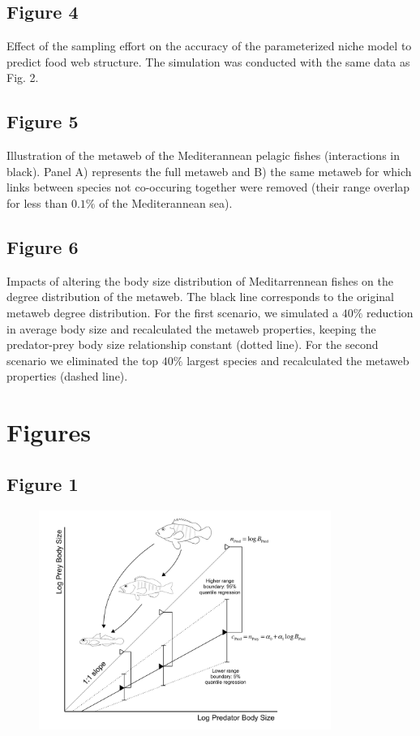 \documentclass[12pt]{article}
\begin{document}
\subsection*{Figure 4} 
Effect of the sampling effort on the accuracy of the
parameterized niche model to predict food web structure. The simulation was
conducted with the same data as Fig. 2.

\subsection*{Figure 5} 
Illustration of the metaweb of the Mediterannean pelagic
fishes (interactions in black). Panel A) represents the full metaweb and B) the
same metaweb for which links between species not co-occuring together were
removed (their range overlap for less than $0.1\%$ of the Mediterannean sea).

\subsection*{Figure 6} 
Impacts of altering the body size distribution of
Meditarrennean fishes on the degree distribution of the metaweb. The black line
corresponds to the original metaweb degree distribution. For the first scenario,
we simulated a $40\%$ reduction in average body size and recalculated the
metaweb properties, keeping the predator-prey body size relationship constant
(dotted line). For the second scenario we eliminated the top $40\%$ largest
species and recalculated the metaweb properties (dashed line).

\newpage
\section*{Figures}

\subsection*{Figure 1}

\begin{figure}[ht!]
	\centering\includegraphics[width=0.85\textwidth]{Schema_niche_allometric.pdf}
\end{figure}
\end{document}
